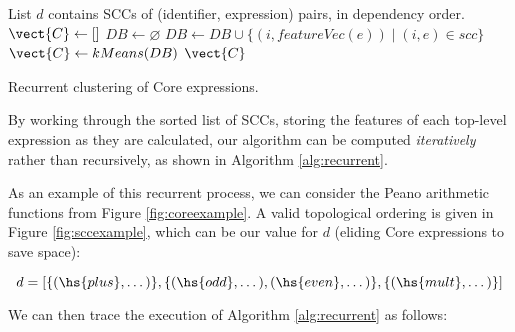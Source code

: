 \begin{algorithm}
  \begin{algorithmic}[1]
    \Require List $d$ contains SCCs of (identifier, expression) pairs, in
    dependency order.
      \State $\vect{C} \gets []$
      \State $DB \gets \varnothing$
        \State $DB \gets DB \cup \{(i, featureVec(e)) \mid (i, e) \in scc\}$
        \State $\vect{C} \gets kMeans(DB)$
      \EndFor
      \Return $\vect{C}$
    \EndProcedure
  \end{algorithmic}
  \caption{Recurrent clustering of Core expressions.}
  \label{alg:recurrent}
\end{algorithm}

By working through the sorted list of SCCs, storing the features of each
top-level expression as they are calculated, our algorithm can be computed
\emph{iteratively} rather than recursively, as shown in Algorithm
\ref{alg:recurrent}.

\iffalse
As an example of this recurrent process, we can consider the Peano arithmetic functions from Figure \ref{fig:coreexample}. A valid topological ordering is given in Figure \ref{fig:sccexample}, which can be our value for $d$ (eliding Core expressions to save space):

\begin{equation}
  d = [\{(\hs{plus}, \dots)\},
       \{(\hs{odd}, \dots), (\hs{even}, \dots)\},
       \{(\hs{mult}, \dots)\}]
\end{equation}

We can then trace the execution of Algorithm \ref{alg:recurrent} as follows:

